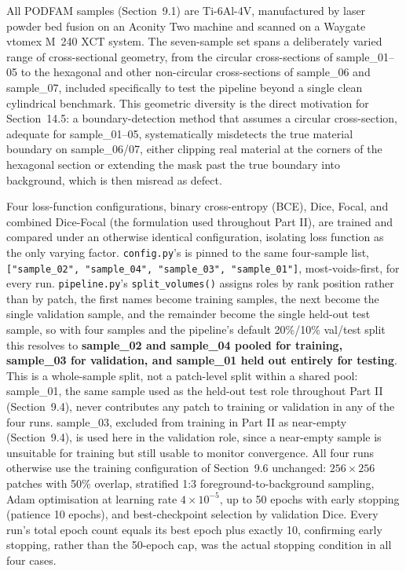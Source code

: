 All PODFAM samples (Section~9.1) are Ti-6Al-4V, manufactured by laser powder bed fusion on an Aconity
Two machine and scanned on a Waygate v\textbar tome\textbar x M~240 XCT system. The seven-sample set
spans a deliberately varied range of cross-sectional geometry, from the circular cross-sections of
sample\_01--05 to the hexagonal and other non-circular cross-sections of sample\_06 and sample\_07,
included specifically to test the pipeline beyond a single clean cylindrical benchmark. This geometric
diversity is the direct motivation for Section~14.5: a boundary-detection method that assumes a
circular cross-section, adequate for sample\_01--05, systematically misdetects the true material
boundary on sample\_06/07, either clipping real material at the corners of the hexagonal section or
extending the mask past the true boundary into background, which is then misread as defect.

Four loss-function configurations, binary cross-entropy (BCE), Dice, Focal, and combined Dice-Focal
(the formulation used throughout Part II), are trained and compared under an otherwise identical
configuration, isolating loss function as the only varying factor. \texttt{config.py}'s
 is pinned to the same four-sample list,
\texttt{["sample\_02", "sample\_04", "sample\_03", "sample\_01"]}, most-voids-first, for every run.
\texttt{pipeline.py}'s \texttt{split\_volumes()} assigns roles by rank position rather than by patch,
the first  names become training samples, the next  become the single
validation sample, and the remainder become the single held-out test sample, so with four samples and
the pipeline's default 20\%/10\% val/test split this resolves to \textbf{sample\_02 and sample\_04
pooled for training, sample\_03 for validation, and sample\_01 held out entirely for testing}. This is
a whole-sample split, not a patch-level split within a shared pool: sample\_01, the same sample used
as the held-out test role throughout Part II (Section~9.4), never contributes any patch to training
or validation in any of the four runs. sample\_03, excluded from training in Part II as near-empty
(Section~9.4), is used here in the validation role, since a near-empty sample is unsuitable for
training but still usable to monitor convergence. All four runs otherwise use the training
configuration of Section~9.6 unchanged: $256\times256$ patches with 50\% overlap, stratified 1:3
foreground-to-background sampling, Adam optimisation at learning rate $4\times10^{-5}$, up to 50
epochs with early stopping (patience 10 epochs), and best-checkpoint selection by validation Dice.
Every run's total epoch count equals its best epoch plus exactly 10, confirming early stopping, rather
than the 50-epoch cap, was the actual stopping condition in all four cases.

